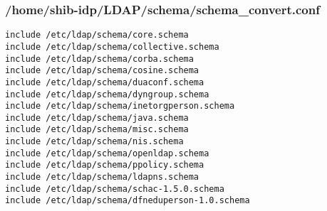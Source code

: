 \subsubsection{/home/shib-idp/LDAP/schema/schema\_convert.conf}
\begin{lstlisting}
include /etc/ldap/schema/core.schema
include /etc/ldap/schema/collective.schema
include /etc/ldap/schema/corba.schema
include /etc/ldap/schema/cosine.schema
include /etc/ldap/schema/duaconf.schema
include /etc/ldap/schema/dyngroup.schema
include /etc/ldap/schema/inetorgperson.schema
include /etc/ldap/schema/java.schema
include /etc/ldap/schema/misc.schema
include /etc/ldap/schema/nis.schema
include /etc/ldap/schema/openldap.schema
include /etc/ldap/schema/ppolicy.schema
include /etc/ldap/schema/ldapns.schema
include /etc/ldap/schema/schac-1.5.0.schema
include /etc/ldap/schema/dfneduperson-1.0.schema
\end{lstlisting}

